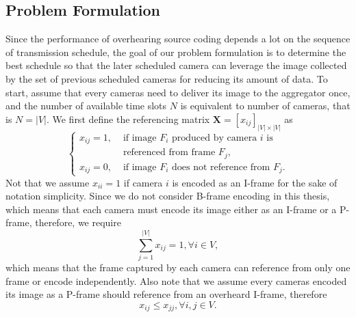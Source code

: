 \subsection{Problem Formulation}
Since the performance of overhearing source coding depends a lot on the sequence of transmission schedule, the goal of our problem formulation is to determine the best schedule so that the later scheduled camera can leverage the image collected by the set of previous scheduled cameras for reducing its amount of data.
To start, assume that every cameras need to deliver its image to the aggregator once, and the number of available time slots $N$ is equivalent to number of cameras, that is ${N=|V|}$.
We first 
define the referencing matrix ${\mathbf{X} = [x_{ij}]_{|V| \times |V|}}$ as
\begin{equation*}
\left\{ \begin{array}{ll}
x_{ij} = 1, &\text{ if image $F_i$ produced by camera $i$ is} \\
                   &\text{ referenced from frame $F_j$,} \\
x_{ij} = 0, &\text{ if image $F_i$ does not reference from $F_j$.}
\end{array} \right.
\end{equation*}
Not that we assume $x_{ii}=1$ if camera $i$ is encoded as an I-frame for the sake of notation simplicity.
Since we do not consider B-frame encoding in this thesis, which means that each camera must encode its image either as an I-frame or a P-frame, therefore, we require
\begin{equation}
\sum_{j=1}^{|V|} x_{ij} = 1, \forall i \in V,
\label{eq::referenceConstraint}
\end{equation}
which means that the frame captured by each camera can reference from only one frame or encode independently.
Also note that we assume every cameras encoded its image as a P-frame should reference from an overheard I-frame, therefore
\begin{equation}
x_{ij} \leq x_{jj}, \forall i,j \in V.
\label{eq::referenceOnlyIframe}
\end{equation}

